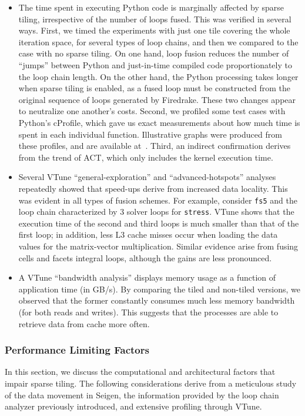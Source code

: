 \begin{itemize}
\item The time spent in executing Python code is marginally affected by sparse tiling, irrespective of the number of loops fused. This was verified in several ways. First, we timed the experiments with just one tile covering the whole iteration space, for several types of loop chains, and then we compared to the case with no sparse tiling. On one hand, loop fusion reduces the number of ``jumps'' between Python and just-in-time compiled code proportionately to the loop chain length. On the other hand, the Python processing takes longer when sparse tiling is enabled, as a fused loop must be constructed from the original sequence of loops generated by Firedrake. These two changes appear to neutralize one another's costs. Second, we profiled some test cases with Python's cProfile, which gave us exact measurements about how much time is spent in each individual function. Illustrative graphs were produced from these profiles, and are available at~\citep{phd-thesis-repo}. Third, an indirect confirmation derives from the trend of ACT, which only includes the kernel execution time.
\item Several VTune ``general-exploration'' and ``advanced-hotspots'' analyses repeatedly showed that speed-ups derive from increased data locality. This was evident in all types of fusion schemes. For example, consider {\tt fs5} and the loop chain characterized by 3 solver loops for {\tt stress}. VTune shows that the execution time of the second and third loops is much smaller than that of the first loop; in addition, less L3 cache misses occur when loading the data values for the matrix-vector multiplication. Similar evidence arise from fusing cells and facets integral loops, although the gains are less pronounced.
\item A VTune ``bandwidth analysis'' displays memory usage as a function of application time (in GB/s). By comparing the tiled and non-tiled versions, we observed that the former constantly consumes much less memory bandwidth (for both reads and writes). This suggests that the processes are able to retrieve data from cache more often.
\end{itemize}

\subsubsection{Performance Limiting Factors}
\label{sec:tiling:seigen:plf}
In this section, we discuss the computational and architectural factors that impair sparse tiling. The following considerations derive from a meticulous study of the data movement in Seigen, the information provided by the loop chain analyzer previously introduced, and extensive profiling through VTune. 

